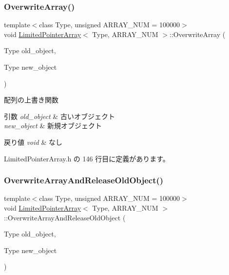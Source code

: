 \subsubsection{\texorpdfstring{Overwrite\+Array()}{OverwriteArray()}}
{\footnotesize\ttfamily template$<$class Type, unsigned A\+R\+R\+A\+Y\+\_\+\+N\+UM = 100000$>$ \\
void \mbox{\hyperlink{class_limited_pointer_array}{Limited\+Pointer\+Array}}$<$ Type, A\+R\+R\+A\+Y\+\_\+\+N\+UM $>$\+::Overwrite\+Array (\begin{DoxyParamCaption}\item[{Type}]{old\+\_\+object,  }\item[{Type}]{new\+\_\+object }\end{DoxyParamCaption})\hspace{0.3cm}{\ttfamily [inline]}}



配列の上書き関数 


\begin{DoxyParams}{引数}
{\em old\+\_\+object} & 古いオブジェクト \\
\hline
{\em new\+\_\+object} & 新規オブジェクト \\
\hline
\end{DoxyParams}

\begin{DoxyRetVals}{戻り値}
{\em void} & なし \\
\hline
\end{DoxyRetVals}


 Limited\+Pointer\+Array.\+h の 146 行目に定義があります。

\mbox{\label{class_limited_pointer_array_a6c46bb77df04a9e1226025f8c48e26cb}} 
\subsubsection{\texorpdfstring{Overwrite\+Array\+And\+Release\+Old\+Object()}{OverwriteArrayAndReleaseOldObject()}}
{\footnotesize\ttfamily template$<$class Type, unsigned A\+R\+R\+A\+Y\+\_\+\+N\+UM = 100000$>$ \\
void \mbox{\hyperlink{class_limited_pointer_array}{Limited\+Pointer\+Array}}$<$ Type, A\+R\+R\+A\+Y\+\_\+\+N\+UM $>$\+::Overwrite\+Array\+And\+Release\+Old\+Object (\begin{DoxyParamCaption}\item[{Type}]{old\+\_\+object,  }\item[{Type}]{new\+\_\+object }\end{DoxyParamCaption})\hspace{0.3cm}{\ttfamily [inline]}}



